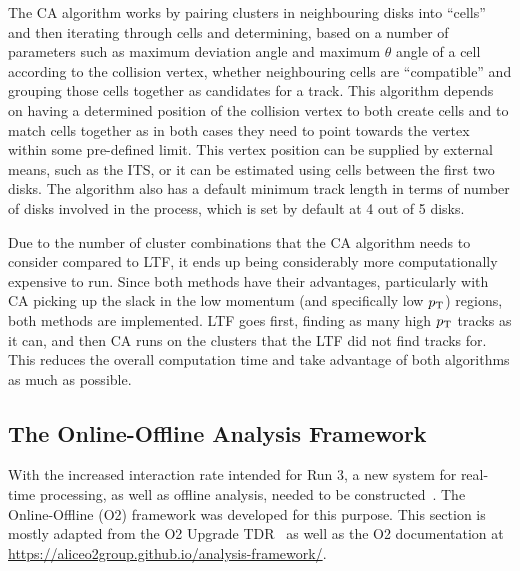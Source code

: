 The CA algorithm works by pairing clusters in neighbouring disks into ``cells'' and then iterating through cells and determining, based on a number of parameters such as maximum deviation angle and maximum $\theta$ angle of a cell according to the collision vertex, whether neighbouring cells are ``compatible'' and grouping those cells together as candidates for a track. This algorithm depends on having a determined position of the collision vertex to both create cells and to match cells together as in both cases they need to point towards the vertex within some pre-defined limit. This vertex position can be supplied by external means, such as the ITS, or it can be estimated using cells between the first two disks. The algorithm also has a default minimum track length in terms of number of disks involved in the process, which is set by default at 4 out of 5 disks. 

Due to the number of cluster combinations that the CA algorithm needs to consider compared to LTF, it ends up being considerably more computationally expensive to run. Since both methods have their advantages, particularly with CA picking up the slack in the low momentum (and specifically low $p_\mathrm{T}$) regions, both methods are implemented. LTF goes first, finding as many high $p_\mathrm{T}$ tracks as it can, and then CA runs on the clusters that the LTF did not find tracks for. This reduces the overall computation time and take advantage of both algorithms as much as possible. 


\subsection{The Online-Offline Analysis Framework}
With the increased interaction rate intended for Run 3, a new system for real-time processing, as well as offline analysis, needed to be constructed~\cite{ALICE_Upgrade_LOI}. The Online-Offline (O2) framework was developed for this purpose. This section is mostly adapted from the O2 Upgrade TDR~\cite{O2_Upgrade_TDR} as well as the O2 documentation at \url{https://aliceo2group.github.io/analysis-framework/}.


